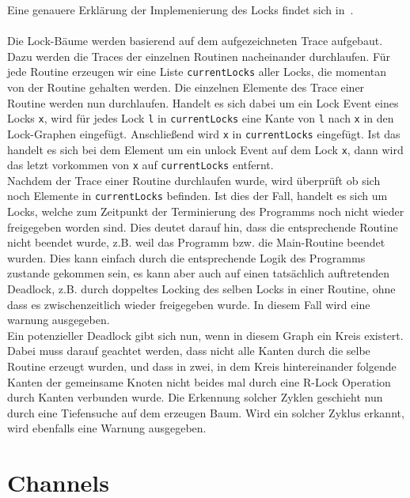 Eine 
genauere Erklärung der Implemenierung des Locks findet sich in~\cite{bachelor-project}. 
  \\\\
Die Lock-Bäume werden basierend auf dem aufgezeichneten Trace aufgebaut. Dazu werden die Traces der 
einzelnen Routinen nacheinander durchlaufen. Für jede Routine erzeugen wir eine Liste \texttt{currentLocks} aller 
Locks, die momentan von der Routine gehalten werden. Die einzelnen Elemente des Trace einer 
Routine werden nun durchlaufen. Handelt es sich dabei um ein Lock Event eines Locks \texttt{x}, wird 
für jedes Lock \texttt{l} in \texttt{currentLocks} eine Kante von \texttt{l} nach \texttt{x} in den 
Lock-Graphen eingefügt. Anschließend wird \texttt{x} in \texttt{currentLocks} eingefügt.
Ist das handelt es sich bei dem Element um ein unlock Event auf dem Lock \texttt{x}, dann wird das 
letzt vorkommen von \texttt{x} auf \texttt{currentLocks} entfernt.\\
Nachdem der Trace einer Routine durchlaufen wurde, wird überprüft ob sich noch Elemente in 
\texttt{currentLocks} befinden. Ist dies der Fall, handelt es sich um Locks, welche zum Zeitpunkt der Terminierung 
des Programms noch nicht wieder freigegeben worden sind. Dies deutet darauf hin, dass die
entsprechende Routine nicht beendet wurde, z.B. weil das Programm bzw. die Main-Routine beendet wurden.
Dies kann einfach durch die entsprechende Logik des Programms zustande gekommen sein, es kann aber auch 
auf einen tatsächlich auftretenden Deadlock, z.B. durch doppeltes Locking des selben Locks in einer Routine, ohne dass 
es zwischenzeitlich wieder freigegeben wurde. In diesem Fall wird eine warnung ausgegeben.\\
Ein potenzieller Deadlock gibt sich nun, wenn in diesem Graph ein Kreis existert. Dabei muss darauf 
geachtet werden, dass nicht alle Kanten durch die selbe Routine erzeugt wurden, und dass in 
zwei, in dem Kreis hintereinander folgende Kanten der gemeinsame Knoten nicht beides mal durch eine 
R-Lock Operation durch Kanten verbunden wurde. Die Erkennung solcher Zyklen geschieht nun durch 
eine Tiefensuche auf dem erzeugen Baum. Wird ein solcher Zyklus erkannt, wird ebenfalls eine 
Warnung ausgegeben.




\section{Channels}\label{Chap:Analyse-Sec:Channel}

